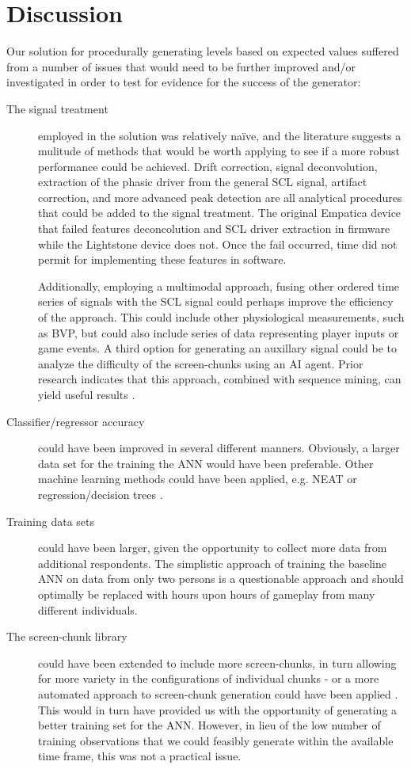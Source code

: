 \documentclass{llncs}
\begin{document}
\section{Discussion}
Our solution for procedurally generating levels based on expected values suffered from a number of issues that would need to be further improved and/or investigated in order to test for evidence for the success of the generator:
\begin{description}
\item [The signal treatment] employed in the solution was relatively naïve, and the literature suggests a mulitude of methods that would be worth applying to see if a more robust performance could be achieved.
Drift correction, signal deconvolution, extraction of the phasic driver from the general SCL signal, artifact correction, and more advanced peak detection are all analytical procedures that could be added to the signal treatment. The original Empatica device that failed features deconcolution and SCL driver extraction in firmware while the Lightstone device does not. Once the fail occurred, time did not permit for implementing these features in software.

Additionally, employing a multimodal approach, fusing other ordered time series of signals with the SCL signal could perhaps improve the efficiency of the approach\cite{martinez2011mining}. This could include other physiological measurements, such as BVP, but could also include series of data representing player inputs or game events.
A third option for generating an auxillary signal could be to analyze the difficulty of the screen-chunks using an AI agent.
Prior research indicates that this approach, combined with sequence mining, can yield useful results \cite{martinez2011mining}.%
\item [Classifier/regressor accuracy] could have been improved in several different manners. Obviously, a larger data set for the training the ANN would have been preferable. Other machine learning methods could have been applied, e.g. NEAT or regression/decision trees \cite{liu2009dynamic}.
\item [Training data sets] could have been larger, given the opportunity to collect more data from additional respondents.
The simplistic approach of training the baseline ANN on data from only two persons is a questionable approach and should optimally be replaced with hours upon hours of gameplay from many different individuals.
\item [The screen-chunk library] could have been extended to include more screen-chunks, in turn allowing for more variety in the configurations of individual chunks - or a more automated approach to screen-chunk generation could have been applied \cite{shaker2011feature}.
This would in turn have provided us with the opportunity of generating a better training set for the ANN. However, in lieu of the low number of training observations that we could feasibly generate within the available time frame, this was not a practical issue.
\end{description}
\end{document}
